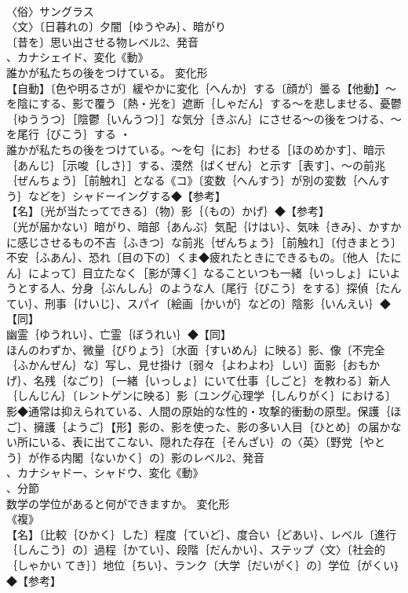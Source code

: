 \documentclass[8pt]{extreport}
\begin{document}
\begin{CJK}{UTF8}{min}
\\	〈俗〉サングラス
\\	〈文〉〔日暮れの〕夕闇｛ゆうやみ｝、暗がり
\\	〔昔を〕思い出させる物レベル2、発音
\\	、カナシェイド、変化《動》
\\	誰かが私たちの後をつけている。	変化形 
\\	【自動】〔色や明るさが〕緩やかに変化｛へんか｝する〔顔が〕曇る【他動】～を陰にする、影で覆う〔熱・光を〕遮断｛しゃだん｝する～を悲しませる、憂鬱｛ゆううつ｝［陰鬱｛いんうつ｝］な気分｛きぶん｝にさせる～の後をつける、～を尾行｛びこう｝する ・
\\	誰かが私たちの後をつけている。～を匂｛にお｝わせる［ほのめかす］、暗示｛あんじ｝［示唆｛しさ｝］する、漠然｛ばくぜん｝と示す［表す］、～の前兆｛ぜんちょう｝［前触れ］となる《コ》〔変数｛へんすう｝が別の変数｛へんすう｝などを〕シャドーイングする◆【参考】
\\	【名】〔光が当たってできる〕（物）影｛（もの）かげ｝◆【参考】
\\	〔光が届かない〕暗がり、暗部｛あんぶ｝気配｛けはい｝、気味｛きみ｝、かすかに感じさせるもの不吉｛ふきつ｝な前兆｛ぜんちょう｝［前触れ］〔付きまとう〕不安｛ふあん｝、恐れ〔目の下の〕くま◆疲れたときにできるもの。〔他人｛たにん｝によって〕目立たなく［影が薄く］なることいつも一緒｛いっしょ｝にいようとする人、分身｛ぶんしん｝のような人〔尾行｛びこう｝をする〕探偵｛たんてい｝、刑事｛けいじ｝、スパイ〔絵画｛かいが｝などの〕陰影｛いんえい｝◆【同】
\\	幽霊｛ゆうれい｝、亡霊｛ぼうれい｝◆【同】
\\	ほんのわずか、微量｛びりょう｝〔水面｛すいめん｝に映る〕影、像〔不完全｛ふかんぜん｝な〕写し、見せ掛け〔弱々｛よわよわ｝しい〕面影｛おもかげ｝、名残｛なごり｝〔一緒｛いっしょ｝にいて仕事｛しごと｝を教わる〕新人｛しんじん｝〔レントゲンに映る〕影〔ユング心理学｛しんりがく｝における〕影◆通常は抑えられている、人間の原始的な性的・攻撃的衝動の原型。保護｛ほご｝、擁護｛ようご｝【形】影の、影を使った、影の多い人目｛ひとめ｝の届かない所にいる、表に出てこない、隠れた存在｛そんざい｝の〈英〉〔野党｛やとう｝が作る内閣｛ないかく｝の〕影のレベル2、発音
\\	、カナシャドー、シャドウ、変化《動》
\\	、分節
\\	数学の学位があると何ができますか。	変化形 
\\	《複》
\\	【名】〔比較｛ひかく｝した〕程度｛ていど｝、度合い｛どあい｝、レベル〔進行｛しんこう｝の〕過程｛かてい｝、段階｛だんかい｝、ステップ〈文〉〔社会的｛しゃかい てき｝〕地位｛ちい｝、ランク〔大学｛だいがく｝の〕学位｛がくい｝◆【参考】

\end{CJK}
\end{document}
